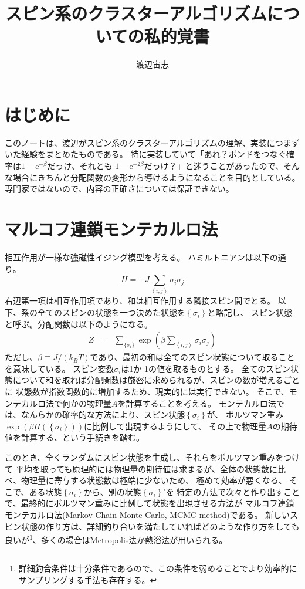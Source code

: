 \documentclass{jarticle}
\title{スピン系のクラスターアルゴリズムについての私的覚書}
\author{渡辺宙志}
\affiliation{東京大学物性研究所}
\begin{document}
\maketitle

\section{はじめに}
このノートは、渡辺がスピン系のクラスターアルゴリズムの理解、実装につまずいた経験をまとめたものである。
特に実装していて「あれ？ボンドをつなぐ確率は$1 - \mathrm{e}^{-\beta}$だっけ、それとも
$1 - \mathrm{e}^{-2\beta}$だっけ？」と迷うことがあったので、そんな場合にきちんと分配関数の変形から導けるようになることを目的としている。
専門家ではないので、内容の正確さについては保証できない。

\section{マルコフ連鎖モンテカルロ法}

相互作用が一様な強磁性イジング模型を考える。
ハミルトニアンは以下の通り。
\begin{equation}
  H = -J \sum_{\left<i, j\right>} \sigma_i \sigma_j
\end{equation}
右辺第一項は相互作用項であり、和は相互作用する隣接スピン間でとる。
以下、系の全てのスピンの状態を一つ決めた状態を$\left\{ \sigma_i \right\}$と略記し、
スピン状態と呼ぶ。分配関数は以下のようになる。
\begin{eqnarray}
  Z &=& \sum_{\{\sigma_i\}} \exp\left(\beta \sum_{\left<i, j\right>} \sigma_i \sigma_j \right) \label{eq_Z}
\end{eqnarray}
ただし、$\beta \equiv J/(k_B T)$であり、最初の和は全てのスピン状態について取ることを意味している。
スピン変数$\sigma_i$は1か-1の値を取るものとする。
全てのスピン状態について和を取れば分配関数は厳密に求められるが、スピンの数が増えるごとに
状態数が指数関数的に増加するため、現実的には実行できない。
そこで、モンテカルロ法で何かの物理量$A$を計算することを考える。
モンテカルロ法では、なんらかの確率的な方法により、スピン状態$\left\{\sigma_i  \right\}$が、
ボルツマン重み$\exp\left( \beta H(\left\{\sigma_i  \right\})\right)$に比例して出現するようにして、
その上で物理量$A$の期待値を計算する、という手続きを踏む。

このとき、全くランダムにスピン状態を生成し、それらをボルツマン重みをつけて
平均を取っても原理的には物理量の期待値は求まるが、全体の状態数に比べ、物理量に寄与する状態数は極端に少ないため、
極めて効率が悪くなる、
そこで、ある状態$\left\{\sigma_i  \right\}$から、別の状態$\left\{\sigma_i  \right\}'$を
特定の方法で次々と作り出すことで、最終的にボルツマン重みに比例して状態を出現させる方法が
マルコフ連鎖モンテカルロ法(Markov-Chain Monte Carlo, MCMC method)である。
新しいスピン状態の作り方は、詳細釣り合いを満たしていればどのような作り方をしても良いが\footnote{詳細釣合条件は十分条件であるので、この条件を弱めることでより効率的にサンプリングする手法も存在する。}、多くの場合はMetropolis法か熱浴法が用いられる。
\end{document}
